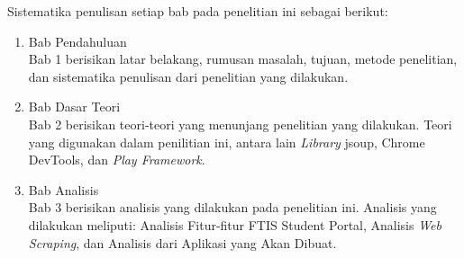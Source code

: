 Sistematika penulisan setiap bab pada penelitian ini sebagai berikut:

\begin{enumerate}
  \item Bab Pendahuluan \\
  Bab 1 berisikan latar belakang, rumusan masalah, tujuan, metode penelitian,
  dan sistematika penulisan dari penelitian yang dilakukan.
  \item Bab Dasar Teori \\
  Bab 2 berisikan teori-teori yang menunjang penelitian yang dilakukan. Teori
  yang digunakan dalam penilitian ini, antara lain \textit{Library} jsoup, Chrome DevTools, dan \textit{Play Framework}.
  \item Bab Analisis \\
  Bab 3 berisikan analisis yang dilakukan pada penelitian ini. Analisis yang
  dilakukan meliputi: Analisis Fitur-fitur FTIS Student Portal, Analisis \textit{Web Scraping}, 
	dan Analisis dari Aplikasi yang Akan Dibuat.
\end{enumerate}
